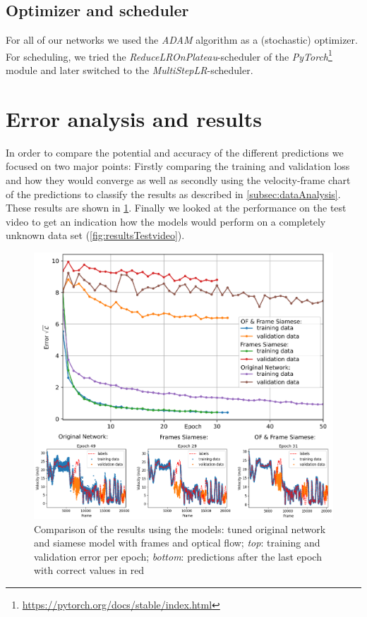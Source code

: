 \documentclass[conference]{IEEEtran}
\begin{document}
\subsection{Optimizer and scheduler}
For all of our networks we used the \emph{ADAM} \cite{Adam2014} algorithm as a (stochastic) optimizer. 
For scheduling, we tried the \emph{ReduceLROnPlateau}-scheduler of the \emph{PyTorch}\footnote{
\url{https://pytorch.org/docs/stable/index.html}} module and later
switched to the \emph{MultiStepLR}-scheduler.

\section{Error analysis and results}
In order to compare the potential and accuracy of the different predictions we focused on two major points: Firstly comparing the training and validation loss and how they would converge as well as secondly using the velocity-frame chart of the predictions to classify the results as described in \cref{subsec:dataAnalysis}. These results are shown in \cref{fig:resultsSummary}. Finally we looked at the performance on the test video to get an indication how the models would perform on a completely unknown data set (\cref{fig:resultsTestvideo}).

\begin{figure}[ht]
	\centering
	\includegraphics[width=0.99\columnwidth]{imgs/TrainingProcess.eps}
	\caption{Comparison of the results using the models: tuned original network and siamese model with frames and optical flow; \textit{top}: training and validation error per epoch; 
	\emph{bottom}: predictions after the last epoch with correct values in red}
	\label{fig:resultsSummary}
\end{figure}
\end{document}
